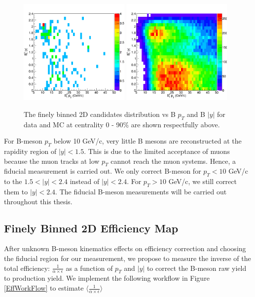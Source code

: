 \begin{figure}[h]
\begin{center}
\includegraphics[width= 0.48\textwidth]{Figures/Chapter5/hBptByData.png}
\includegraphics[width= 0.48\textwidth]{Figures/Chapter5/hBptByMC.png}
\caption{The finely binned 2D candidates distribution vs B $p_T$ and B $|y|$ for data and MC at centrality 0 - 90\% are shown respectfully above.}
\label{Bs2DRECO}
\end{center}
\end{figure}

For B-meson $p_T$ below 10 GeV/c, very little B mesons are reconstructed at the rapidity region of $|y| < 1.5$. This is due to the limited acceptance of muons because the muon tracks at low $p_T$ cannot reach the muon systems. Hence, a fiducial measurement is carried out. We only correct B-meson for $p_T < 10$ GeV/c to the $1.5 < |y| < 2.4$ instead of $|y| < 2.4$. For $p_T > 10$ GeV/c, we still correct them to $|y| < 2.4$. The fiducial B-meson measurements will be carried out throughout this thesis.

\subsection{Finely Binned 2D Efficiency Map}

After unknown B-meson kinematics effects on efficiency correction and choosing the fiducial region for our measurement, we propose to measure the inverse of the total efficiency: $\frac{1}{\alpha \times \epsilon}$ as a function of $p_T$ and $|y|$ to correct the B-meson raw yield to production yield. We implement the following workflow in Figure \ref{EffWorkFlow} to estimate $\langle \frac{1}{\alpha \times \epsilon} \rangle$


